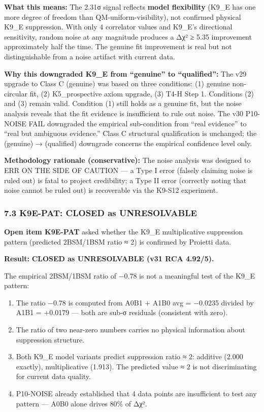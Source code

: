 \documentclass[
  11pt,
]{article}
\providecommand{\tightlist}{%
  \setlength{\itemsep}{0pt}\setlength{\parskip}{0pt}}
\begin{document}
\textbf{What this means:} The 2.31σ signal reflects \textbf{model
flexibility} (K9\_E has one more degree of freedom than
QM-uniform-visibility), not confirmed physical K9\_E suppression. With
only 4 correlator values and K9\_E's directional sensitivity, random
noise at any magnitude produces a Δχ² ≥ 5.35 improvement approximately
half the time. The genuine fit improvement is real but not
distinguishable from a noise artifact with current data.

\textbf{Why this downgraded K9\_E from ``genuine'' to ``qualified'':}
The v29 upgrade to Class C (genuine) was based on three conditions: (1)
genuine non-circular fit, (2) K5\_prospective axiom upgrade, (3) T4-H
Step 1. Conditions (2) and (3) remain valid. Condition (1) still holds
as a genuine fit, but the noise analysis reveals that the fit evidence
is insufficient to rule out noise. The v30 P10-NOISE FAIL downgraded the
empirical sub-condition from ``real evidence'' to ``real but ambiguous
evidence.'' Class C structural qualification is unchanged; the (genuine)
→ (qualified) downgrade concerns the empirical confidence level only.

\textbf{Methodology rationale (conservative):} The noise analysis was
designed to ERR ON THE SIDE OF CAUTION --- a Type I error (falsely
claiming noise is ruled out) is fatal to project credibility; a Type II
error (correctly noting that noise cannot be ruled out) is recoverable
via the K9-S12 experiment.

\subsubsection{7.3 K9E-PAT: CLOSED as
UNRESOLVABLE}\label{k9e-pat-closed-as-unresolvable}

\textbf{Open item K9E-PAT} asked whether the K9\_E multiplicative
suppression pattern (predicted 2BSM/1BSM ratio ≈ 2) is confirmed by
Proietti data.

\textbf{Result:} \textbf{CLOSED as UNRESOLVABLE (v31 RCA 4.92/5).}

The empirical 2BSM/1BSM ratio of −0.78 is not a meaningful test of the
K9\_E pattern:

\begin{enumerate}
\def\labelenumi{\arabic{enumi}.}
\tightlist
\item
  The ratio −0.78 is computed from A0B1 + A1B0 avg = −0.0235 divided by
  A1B1 = +0.0179 --- both are sub-σ residuals (consistent with zero).
\item
  The ratio of two near-zero numbers carries no physical information
  about suppression structure.
\item
  Both K9\_E model variants predict suppression ratio ≈ 2: additive
  (2.000 exactly), multiplicative (1.913). The predicted value ≈ 2 is
  not discriminating for current data quality.
\item
  P10-NOISE already established that 4 data points are insufficient to
  test any pattern --- A0B0 alone drives 80\% of Δχ².
\end{enumerate}
\end{document}
